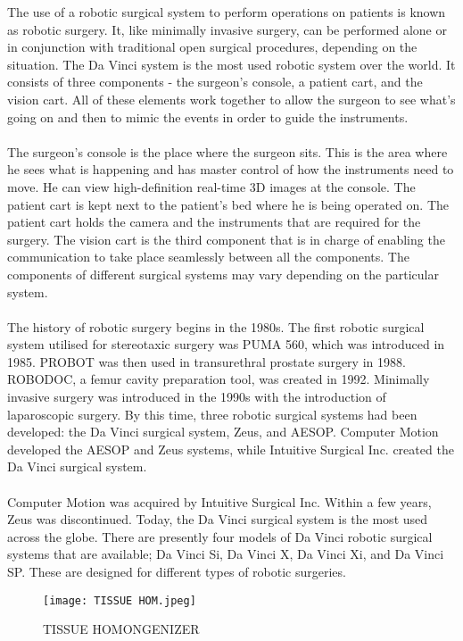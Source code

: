 \documentclass[a4paper,12pt]{article}
\begin{document}
 \medspace

 The use of a robotic surgical system to perform operations on patients is known as robotic surgery. It, like minimally invasive surgery, can be performed alone or in conjunction with traditional open surgical procedures, depending on the situation. The Da Vinci system is the most used robotic system over the world. It consists of three components - the surgeon’s console, a patient cart, and the vision cart. All of these elements work together to allow the surgeon to see what's going on and then to mimic the events in order to guide the instruments.
 \\
 \\
 The surgeon’s console is the place where the surgeon sits. This is the area where he sees what is happening and has master control of how the instruments need to move. He can view high-definition real-time 3D images at the console. The patient cart is kept next to the patient’s bed where he is being operated on. The patient cart holds the camera and the instruments that are required for the surgery. The vision cart is the third component that is in charge of enabling the communication to take place seamlessly between all the components. The components of different surgical systems may vary depending on the particular system.
 \\
 \\
The history of robotic surgery begins in the 1980s. The first robotic surgical system utilised for stereotaxic surgery was PUMA 560, which was introduced in 1985. PROBOT was then used in transurethral prostate surgery in 1988. ROBODOC, a femur cavity preparation tool, was created in 1992. Minimally invasive surgery was introduced in the 1990s with the introduction of laparoscopic surgery. By this time, three robotic surgical systems had been developed: the Da Vinci surgical system, Zeus, and AESOP. Computer Motion developed the AESOP and Zeus systems, while Intuitive Surgical Inc. created the Da Vinci surgical system.
 \\
 \\
 Computer Motion was acquired by Intuitive Surgical Inc. Within a few years, Zeus was discontinued. Today, the Da Vinci surgical system is the most used across the globe. There are presently four models of Da Vinci robotic surgical systems that are available; Da Vinci Si, Da Vinci X, Da Vinci Xi, and Da Vinci SP. These are designed for different types of robotic surgeries.
 \clearpage
 
 \begin{figure}
\centering
\texttt{[image: TISSUE HOM.jpeg]}
\caption{TISSUE HOMONGENIZER  }
\end{figure}
\end{document}
